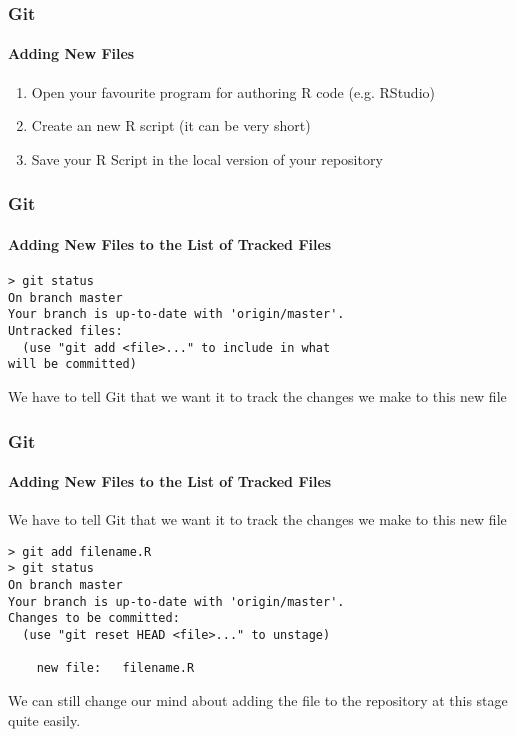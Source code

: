 \documentclass[xcolor=dvipsnames]{beamer}
\begin{document}
\begin{frame}[fragile]
\frametitle{Git}
\framesubtitle{Adding New Files}
\begin{enumerate}
\item Open your favourite program for authoring R code (e.g. RStudio)
\newline
\item Create an new R script (it can be very short) 
\newline
\item Save your R Script in the local version of your repository
\end{enumerate}

\end{frame}

\begin{frame}[fragile]
\frametitle{Git}
\framesubtitle{Adding New Files to the List of Tracked Files}

\begin{block}{}
\begin{lstlisting}
> git status
On branch master
Your branch is up-to-date with 'origin/master'.
Untracked files:
  (use "git add <file>..." to include in what 
will be committed)
\end{lstlisting}
\end{block}

We have to tell Git that we want it to track the changes we make to this new file

\end{frame}

\begin{frame}[fragile]
\frametitle{Git}
\framesubtitle{Adding New Files to the List of Tracked Files}

We have to tell Git that we want it to track the changes we make to this new file
\begin{block}{}
\begin{lstlisting}
> git add filename.R
> git status
On branch master
Your branch is up-to-date with 'origin/master'.
Changes to be committed:
  (use "git reset HEAD <file>..." to unstage)

	new file:   filename.R
\end{lstlisting}
\end{block}
We can still change our mind about adding the file to the repository at this stage quite easily.

\end{frame}
\end{document}
